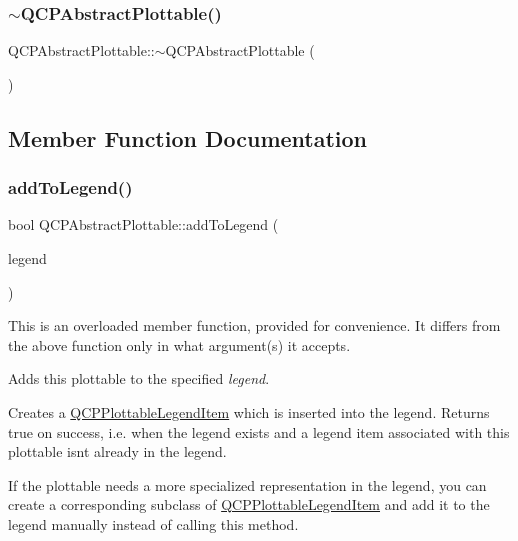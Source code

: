 \subsubsection{\texorpdfstring{$\sim$QCPAbstractPlottable()}{~QCPAbstractPlottable()}}
{\footnotesize\ttfamily Q\+C\+P\+Abstract\+Plottable\+::$\sim$\+Q\+C\+P\+Abstract\+Plottable (\begin{DoxyParamCaption}{ }\end{DoxyParamCaption})\hspace{0.3cm}{\ttfamily [virtual]}}



\subsection{Member Function Documentation}
\mbox{\label{class_q_c_p_abstract_plottable_aa64e93cb5b606d8110d2cc0a349bb30f}} 
\subsubsection{\texorpdfstring{addToLegend()}{addToLegend()}\hspace{0.1cm}{\footnotesize\ttfamily [1/2]}}
{\footnotesize\ttfamily bool Q\+C\+P\+Abstract\+Plottable\+::add\+To\+Legend (\begin{DoxyParamCaption}\item[{\mbox{\hyperlink{class_q_c_p_legend}{Q\+C\+P\+Legend}} $\ast$}]{legend }\end{DoxyParamCaption})}

This is an overloaded member function, provided for convenience. It differs from the above function only in what argument(s) it accepts.

Adds this plottable to the specified {\itshape legend}.

Creates a \mbox{\hyperlink{class_q_c_p_plottable_legend_item}{Q\+C\+P\+Plottable\+Legend\+Item}} which is inserted into the legend. Returns true on success, i.\+e. when the legend exists and a legend item associated with this plottable isn\textquotesingle{}t already in the legend.

If the plottable needs a more specialized representation in the legend, you can create a corresponding subclass of \mbox{\hyperlink{class_q_c_p_plottable_legend_item}{Q\+C\+P\+Plottable\+Legend\+Item}} and add it to the legend manually instead of calling this method.

